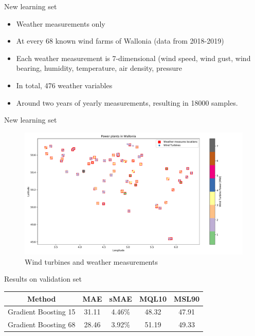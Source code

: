 \documentclass[12pt]{beamer}
\begin{document}
\begin{frame}{New learning set}
   \begin{itemize}
       \item Weather measurements only
       \item At every 68 known wind farms of Wallonia (data from 2018-2019)
       \item Each weather measurement is 7-dimensional (wind speed, wind gust, wind bearing, humidity, temperature, air density, pressure
       \item In total, 476 weather variables
       \item Around two years of yearly measurements, resulting in \num{18 000} samples.
   \end{itemize}
\end{frame}

\begin{frame}{New learning set}
    \begin{figure}[H]
        \centering
        \includegraphics[width=\textwidth]{resources/pdf/power_plants.pdf}
        \caption{Wind turbines and weather measurements}
        \label{fig:wt_wallonia}
    \end{figure}
\end{frame}

\begin{frame}{Results on validation set}
    \begin{tabular}{|c|c|c|c|c|}
        \hline
        Method & MAE\footnotemark[1] & sMAE\footnotemark[1] & MQL10\footnotemark[1] & MSL90\footnotemark[1] \\ \hline
        Gradient Boosting 15 & 31.11 & 4.46\% & 48.32 & 47.91 \\ \hline
        Gradient Boosting 68 & 28.46 & 3.92\% & 51.19 & 49.33 \\ \hline
    \end{tabular}
    \footnotetext[1]{\SI{}{\mega \watt}}
\end{frame}
\end{document}
